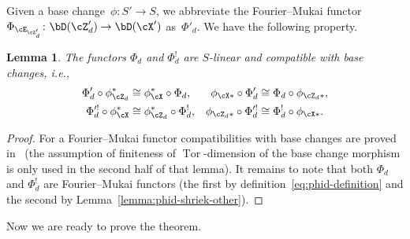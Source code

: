 \documentclass[11pt]{amsart}
\DeclareMathOperator{\Tor}{\mathrm{Tor}}
\theoremstyle{plain}
\newtheorem{lemma}[theorem]{Lemma}
\theoremstyle{definition}
\theoremstyle{remark}
\begin{document}
Given a base change~$\phi \colon S' \to S$, we abbreviate the Fourier--Mukai functor $\Phi_{\cE_{\cZ'_d}} \colon \bD(\cZ'_d) \to \bD(\cX')$ as~$\Phi'_d$.
We have the following property.

\begin{lemma}
\label{lemma:phid-linear}
The functors $\Phi_d$ and $\Phi_d^!$ are $S$-linear and compatible with base changes, i.e.,
\begin{align*}
\Phi'_d \circ \phi_{\cZ_d}^* &\cong \phi_{\cX}^* \circ \Phi_d,
&
\phi_{\cX*} \circ \Phi'_d &\cong \Phi_d \circ \phi_{\cZ_d*},
\\
\Phi^{\prime!}_d \circ \phi_{\cX}^* &\cong \phi_{\cZ_d}^* \circ \Phi_d^!,
&
\phi_{\cZ_d*} \circ \Phi^{\prime!}_d &\cong \Phi_d^! \circ \phi_{\cX*}.
\end{align*}
\end{lemma}
\begin{proof}
For a Fourier--Mukai functor compatibilities with base changes are proved in~\cite[Lemma~2.42]{kuznetsov2006hyperplane}
(the assumption of finiteness of $\Tor$-dimension of the base change morphism is only used in the second half of that lemma).
It remains to note that both $\Phi_d$ and $\Phi_d^!$ are Fourier--Mukai functors (the first by definition~\eqref{eq:phid-definition} and the second by Lemma~\ref{lemma:phid-shriek-other}).
\end{proof}


Now we are ready to prove the theorem.
\end{document}

